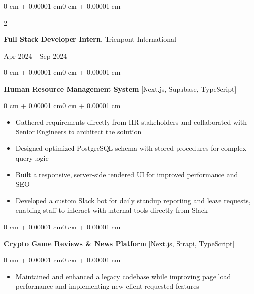 \documentclass[10pt, letterpaper]{article}
\newenvironment{highlights}{
    \begin{itemize}[
        topsep=0.06 cm,
        parsep=0.06 cm,
        partopsep=0pt,
        itemsep=0pt,
        leftmargin=0.4 cm + 10pt
    ]
}{
    \end{itemize}
}
\newenvironment{onecolentry}{
    \begin{adjustwidth}{0 cm + 0.00001 cm}{0 cm + 0.00001 cm}
}{
    \end{adjustwidth}
}
\newenvironment{twocolentry}[2][]{
    \onecolentry
    \def\secondColumn{#2}
    \setcolumnwidth{\fill, 4.5 cm}
    \begin{paracol}{2}
}{
    \switchcolumn \raggedleft \secondColumn
    \end{paracol}
    \endonecolentry
}
\begin{document}
        \vspace{0.36 cm}

        \begin{twocolentry}{
            Apr 2024 -- Sep 2024
        }
            \large\textbf{Full Stack Developer Intern}, Trienpont International
        \end{twocolentry}

        \vspace{0.10 cm}
        \begin{onecolentry}
            \textbf{Human Resource Management System} [Next.js, Supabase, TypeScript]
        \end{onecolentry}

        \vspace{0.10 cm}
        \begin{onecolentry}
            \begin{highlights}
                \item Gathered requirements directly from HR stakeholders and collaborated with Senior Engineers to architect the solution
                \item Designed optimized PostgreSQL schema with stored procedures for complex query logic
                \item Built a responsive, server-side rendered UI for improved performance and SEO
                \item Developed a custom Slack bot for daily standup reporting and leave requests, enabling staff to interact with internal tools directly from Slack
            \end{highlights}
        \end{onecolentry}

        \vspace{0.22 cm}
        \begin{onecolentry}
            \textbf{Crypto Game Reviews \& News Platform} [Next.js, Strapi, TypeScript]
        \end{onecolentry}

        \vspace{0.10 cm}
        \begin{onecolentry}
            \begin{highlights}
                \item Maintained and enhanced a legacy codebase while improving page load performance and implementing new client-requested features
            \end{highlights}
        \end{onecolentry}
\end{document}
